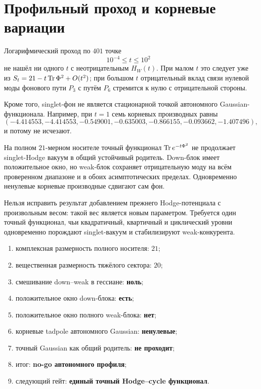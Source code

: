 \section{Профильный проход и корневые вариации}

Логарифмический проход по $401$ точке
\begin{equation}
 10^{-4}\le t\le10^2
 \label{eq:v7-weak-competition-scan-domain}
\end{equation}
не нашёл ни одного $t$ с неотрицательным $H_W(t)$. При малом $t$ это
следует уже из $S_t=21-t\operatorname{Tr}\Phi^2+O(t^2)$; при большом $t$ отрицательный
вклад связи нулевой моды фонового пути $P_3$ с путём $P_6$ стремится к нулю
с отрицательной стороны.

Кроме того, singlet-фон не является стационарной точкой автономного
Gaussian-функционала. Например, при $t=1$ семь корневых производных равны
\begin{equation}
 (-4.414553,-4.414553,-0.549001,-0.635003,
  -0.866155,-0.093662,-1.407496),
 \label{eq:v7-weak-competition-root-tadpoles}
\end{equation}
и потому не исчезают.

\begin{theorem}
На полном $21$-мерном носителе точный функционал $\operatorname{Tr} e^{-t\Phi^2}$ не
продолжает singlet-Hodge вакуум в общий устойчивый родитель. Down-блок имеет
положительное окно, но weak-блок сохраняет отрицательную моду на всём
проверенном диапазоне и в обоих асимптотических пределах. Одновременно
ненулевые корневые производные сдвигают сам фон.
\end{theorem}

\begin{nogocriterion}
Нельзя исправить результат добавлением прежнего Hodge-потенциала с
произвольным весом: такой вес является новым параметром. Требуется один
точный функционал, чьи квадратичный, квартичный и циклический уровни
одновременно порождают singlet-вакуум и стабилизируют weak-конкурента.
\end{nogocriterion}

\begin{protocol}
\begin{enumerate}
 \item комплексная размерность полного носителя: \textbf{$21$};
 \item вещественная размерность тяжёлого сектора: \textbf{$20$};
 \item смешивание down--weak в гессиане: \textbf{ноль};
 \item положительное окно down-блока: \textbf{есть};
 \item положительное окно полного weak-блока: \textbf{нет};
 \item корневые tadpole автономного Gaussian: \textbf{ненулевые};
 \item точный Gaussian как общий родитель: \textbf{не проходит};
 \item итог: \textbf{no-go автономного профиля};
 \item следующий гейт: \textbf{единый точный Hodge--cycle функционал}.
\end{enumerate}
\end{protocol}

